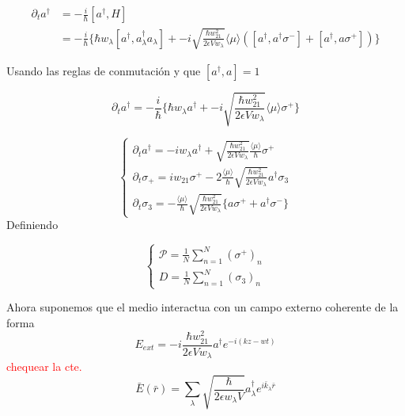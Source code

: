 \begin{align}	
	\partial_t a^{\dagger} &= -\frac{i}{\hbar}[a^{\dagger},H] \nonumber \\
	&= -\frac{i}{\hbar} \{ \hbar w_{\lambda}[a^{\dagger},a^{\dagger}_{\lambda}a_{\lambda}] + -i\sqrt{ \frac{\hbar w_{21}^2}{2\epsilon V w_{\lambda} } }   \langle \mu \rangle (  [a^{\dagger},a^{\dagger}\sigma^-]  +  [a^{\dagger},a\sigma^+]  ) \}     	
\end{align}

Usando las reglas de conmutación y que $ [a^{\dagger},a]=1$

\begin{equation}
	\partial_t a^{\dagger}= -\frac{i}{\hbar} \{ \hbar w_{\lambda}a^{\dagger} + -i\sqrt{ \frac{\hbar w_{21}^2}{2\epsilon V w_{\lambda} } }   \langle \mu \rangle \sigma^+  \}     	
\end{equation}

\begin{equation}
\begin{cases}
	\partial_t a^{\dagger}=  -i w_{\lambda}a^{\dagger} + \sqrt{ \frac{\hbar w_{21}^2}{2\epsilon V w_{\lambda} } }  \frac{\langle \mu \rangle }{\hbar}	 \sigma^+    \\
	\partial_t \sigma_+ =  iw_{21}\sigma^+ - 2 \frac{\langle \mu \rangle }{\hbar} \sqrt{ \frac{\hbar w_{21}^2}{2\epsilon V w_{\lambda} } }   a^{\dagger}\sigma_3\\
	\partial_t \sigma_3=-\frac{\langle \mu \rangle }{\hbar}	\sqrt{ \frac{\hbar w_{21}^2}{2\epsilon V w_{\lambda} } } \{ a\sigma^+ + a^{\dagger}\sigma^-   \}
\end{cases}
\label{eq: quantum rates}
\end{equation}
Definiendo 

\begin{equation}
	\begin{cases}
		\mathcal{P}=\frac{1}{N}\sum_{n=1}^{N}(\sigma^+)_n\\ 
		
		D=\frac{1}{N}\sum_{n=1}^{N}(\sigma_3)_n	
\end{cases}
\end{equation}



Ahora suponemos que el medio interactua con un campo externo coherente de la forma 
\[ E_{ext}=-i \frac{\hbar w_{21}^2}{2\epsilon V w_{\lambda} }  a^{\dagger} e^{-i(kz-wt)}  \]
\textcolor{red}{chequear la cte.}
\[\bar{E}(\bar{r})=\sum_{\lambda}\sqrt{\frac{\hbar}{2\epsilon w_{\lambda}V}} a^{\dagger}_{\lambda}e^{i\bar{k}_{\lambda}\bar{r}}  \]

